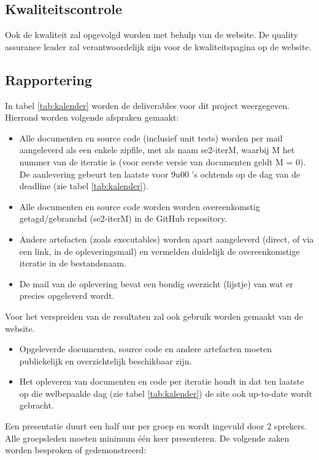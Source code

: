 \subsection{Kwaliteitscontrole}
Ook de kwaliteit zal opgevolgd worden met behulp van de website. De quality assurance leader zal verantwoordelijk zijn voor de kwaliteitspagina op de website.

\subsection{Rapportering}
In tabel \ref{tab:kalender} worden de deliverables voor dit project weergegeven. Hierrond worden volgende afspraken gemaakt:
\begin{itemize}
\item Alle documenten en source code (inclusief unit tests) worden per mail aangeleverd als een enkele zipfile, met als naam se2-iterM, waarbij M het nummer van de iteratie is (voor eerste versie van documenten geldt M = 0). De aanlevering gebeurt ten laatste voor 9u00 ’s ochtends op de dag van de deadline (zie tabel \ref{tab:kalender}).
\item Alle documenten en source code worden worden overeenkomstig getagd/gebranchd (se2-iterM) in de GitHub repository.
\item Andere artefacten (zoals executables) worden apart aangeleverd (direct, of via een link, in de opleveringsmail) en vermelden duidelijk de overeenkomstige iteratie in de bestandsnaam.
\item De mail van de oplevering bevat een bondig overzicht (lijstje) van wat er precies opgeleverd
wordt.
\end{itemize}
Voor het verspreiden van de resultaten zal ook gebruik worden gemaakt van de website. 
\begin{itemize}
\item Opgeleverde documenten, source code en andere artefacten moeten publiekelijk en overzichtelijk beschikbaar zijn.
\item Het opleveren van documenten en code per iteratie houdt in dat ten laatste op die welbepaalde dag (zie tabel \ref{tab:kalender}) de site ook up-to-date wordt gebracht.
\end{itemize}
Een presentatie duurt een half uur per groep en wordt ingevuld door 2 sprekers. Alle groepsleden moeten minimum \'{e}\'{e}n keer presenteren. De volgende zaken worden besproken of gedemonstreerd:
